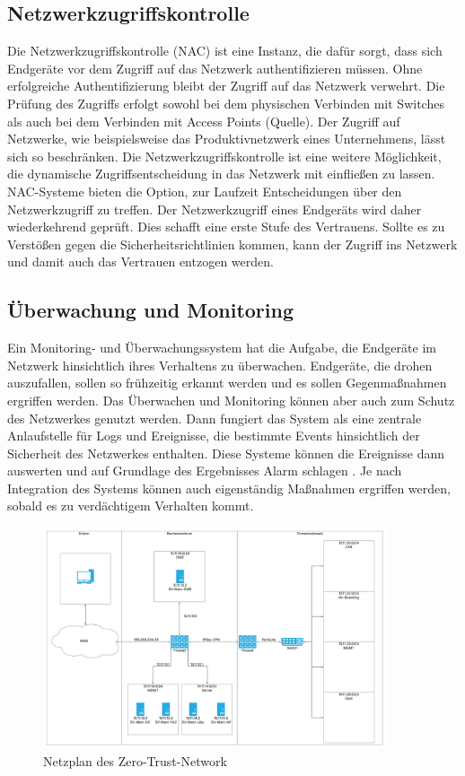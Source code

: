 \documentclass[lettersize,journal]{IEEEtran}
\begin{document}
\subsection{Netzwerkzugriffskontrolle}
Die Netzwerkzugriffskontrolle (NAC) ist eine Instanz, die dafür sorgt, dass sich Endgeräte vor dem Zugriff auf das Netzwerk authentifizieren müssen. Ohne erfolgreiche Authentifizierung bleibt der Zugriff auf das Netzwerk verwehrt. Die Prüfung des Zugriffs erfolgt sowohl bei dem physischen Verbinden mit Switches als auch bei dem Verbinden mit Access Points \cite{} (Quelle). Der Zugriff auf Netzwerke, wie beispielsweise das Produktivnetzwerk eines Unternehmens, lässt sich so beschränken. Die Netzwerkzugriffskontrolle ist eine weitere Möglichkeit, die dynamische Zugriffsentscheidung in das Netzwerk mit einfließen zu lassen. NAC-Systeme bieten die Option, zur Laufzeit Entscheidungen über den Netzwerkzugriff zu treffen. Der Netzwerkzugriff eines Endgeräts wird daher wiederkehrend geprüft. Dies schafft eine erste Stufe des Vertrauens. Sollte es zu Verstößen gegen die Sicherheitsrichtlinien kommen, kann der Zugriff ins Netzwerk und damit auch das Vertrauen entzogen werden.

\subsection{Überwachung und Monitoring}
Ein Monitoring- und Überwachungssystem hat die Aufgabe, die Endgeräte im Netzwerk hinsichtlich ihres Verhaltens zu überwachen. Endgeräte, die drohen auszufallen, sollen so frühzeitig erkannt werden und es sollen Gegenmaßnahmen ergriffen werden. Das Überwachen und Monitoring können aber auch zum Schutz des Netzwerkes genutzt werden. Dann fungiert das System als eine zentrale Anlaufstelle für Logs und Ereignisse, die bestimmte Events hinsichtlich der Sicherheit des Netzwerkes enthalten. Diese Systeme können die Ereignisse dann auswerten und auf Grundlage des Ergebnisses Alarm schlagen \cite{Faber.2021}. Je nach Integration des Systems können auch eigenständig Maßnahmen ergriffen werden, sobald es zu verdächtigem Verhalten kommt.


\begin{figure}[!b]
	\centering
	\includegraphics[width=0.9\textwidth]{Netzwerk-Topologie.pdf}
	\caption{Netzplan des Zero-Trust-Network}
	\label{fig:netzplan}
\end{figure}
\end{document}
